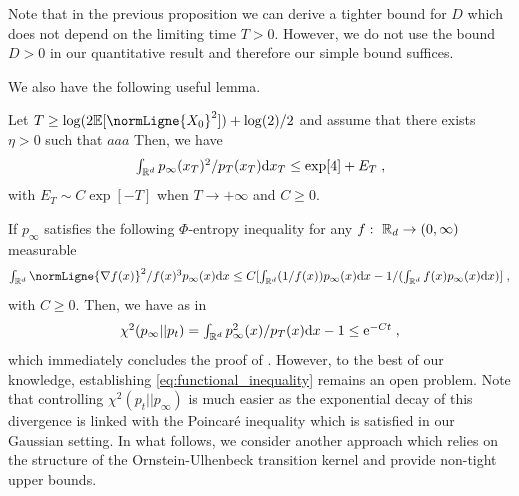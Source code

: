 Note that in the previous proposition we can derive a tighter bound for $D$
which does not depend on the limiting time $T > 0$. However, we do not use the
bound $D>0$ in our quantitative result and therefore our simple bound suffices.

We also have the following useful lemma.

\begin{lemma}
  \label{item:bound_p_infty}
  Let $T \geq \log(2 \expeLigne{\normLigne{X_0}^2}) + \log(2)/2$ and assume that there exists $\eta > 0$ such that $aaa$ Then, we have
  \begin{equation}    
    \textstyle{
      \int_{\mathbb{R}^d} p_\infty(x_T)^2 / p_T(x_T) \mathrm{d}x_T \leq \exp[4] + E_T \;,
      }
    \end{equation}
    with $E_T  \sim C\exp[-T]$ when $T \to +\infty$ and $C \geq 0$.
\end{lemma}

If $p_\infty$ satisfies the following $\Phi$-entropy inequality for any
$f: \ \mathbb{R}_d \to \left(0,\infty\right)$ measurable
\begin{equation}
  \label{eq:functional_inequality}
  \textstyle{
    \int_{\rset^d} \normLigne{\nabla f(x)}^2/f(x)^3 p_\infty(x) \rmd x \leq C [\int_{\rset^d} (1/f(x)) p_\infty(x) \rmd x - 1/(\int_{\rset^d} f(x) p_\infty(x) \rmd x)] \eqsp ,
    }
  \end{equation}
  with $C \geq 0$. Then, we have as in  \cite[Proposition 7.6.1]{bakry:gentil:ledoux:2014}
  \begin{equation}
    \textstyle{
      \chi^2(p_\infty||p_t) = \int_{\mathbb{R}^d} p_\infty^2(x)/p_T(x) \mathrm{d}x - 1 \leq \mathrm{e}^{-Ct} \;,
      }
  \end{equation}
  which immediately concludes the proof of . However,
  to the best of our knowledge, establishing \eqref{eq:functional_inequality}
  remains an open problem. Note that controlling $\chi^2(p_t||p_\infty)$ is much
  easier as the exponential decay of this divergence is linked with the
  Poincar\'e inequality which is satisfied in our Gaussian setting. In what
  follows, we consider another approach which relies on the structure of the
  Ornstein-Ulhenbeck transition kernel and provide non-tight upper bounds.
  
